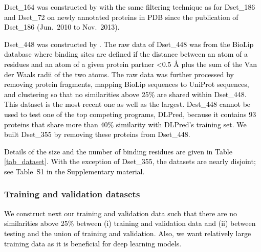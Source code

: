 \documentclass{bioinfo}
\newcommand{\myColor}{black}
\begin{document}
\begin{methods}
\textcolor{\myColor}{
Dset\_164 was constructed by \cite{dhole2014sequence} with the same filtering technique as for Dset\_186 and Dset\_72 on newly annotated proteins in PDB since the publication of Dset\_186 (Jun.~2010 to Nov.~2013). 
}

\textcolor{\myColor}{
Dset\_448 was constructed by \cite{zhang2019scriber}. The raw data of Dset\_448 was from the BioLip database \citep{yang2012biolip} where binding sites are defined if the distance between an atom of a residues and an atom of a given protein partner <0.5 \AA{} plus the sum of the Van der Waals radii of the two atoms. The raw data was further processed by removing protein fragments, mapping BioLip sequences to UniProt sequences, and clustering so that no similarities above 25\% are shared within Dset\_448. This dataset is the most recent one as well as the largest. }
\textcolor{\myColor}{
Dest\_448 cannot be used to test one of the top competing programs, DLPred, because it contains 93 proteins that share more than 40\% similarity with DLPred's training set. We built Dset\_355 by removing these proteins from Dset\_448.}

\textcolor{\myColor}{
Details of the size and the number of binding residues are given in Table \ref{tab_dataset}. With the exception of Dset\_355, the datasets are nearly disjoint; see Table~S1 in the Supplementary material.}

\subsubsection{Training and validation datasets}
\textcolor{\myColor}{
We construct next our training and validation data such that there are no similarities above 25\% between (i) training and validation data and (ii) between testing and the union of training and validation. Also, we want relatively large training data as it is beneficial for deep learning models.}


\end{methods}
\end{document}
